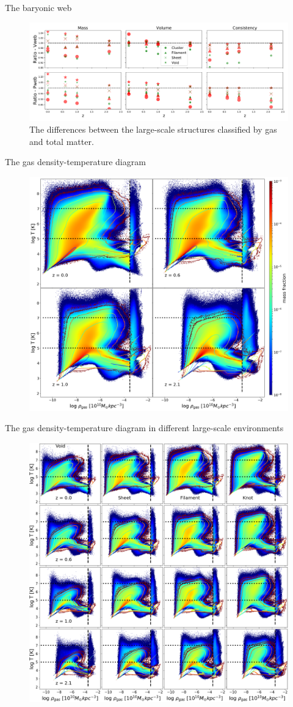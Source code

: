 \documentclass[aspectratio=43]{beamer}
\begin{document}
\begin{frame}{The baryonic web}
  \begin{figure}
    \includegraphics[width=\linewidth]{fraction-gasweb-evolution.png}
    \caption{The differences between the large-scale structures classified by gas and total matter.}
  \end{figure}
\end{frame}

\begin{frame}{The gas density-temperature diagram}
  \begin{figure}
    \includegraphics[width=0.7\linewidth]{RT-evolution.png}
  \end{figure}
\end{frame}

\begin{frame}{The gas density-temperature diagram in different large-scale environments}
  \begin{figure}
    \includegraphics[width=0.6\linewidth]{RTE-evolution.png}
  \end{figure}
\end{frame}
\end{document}
